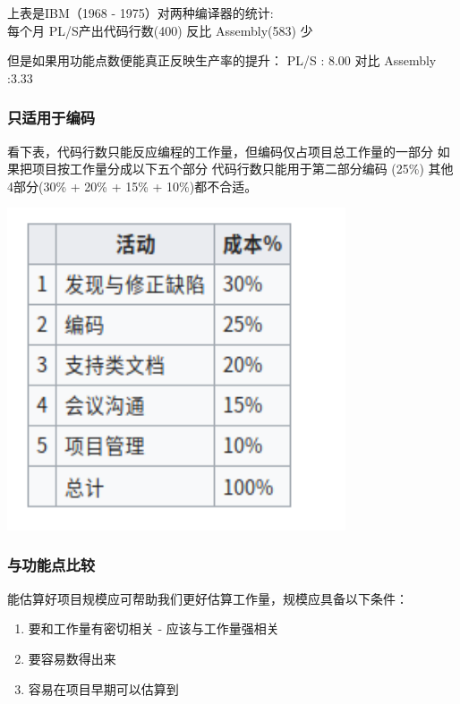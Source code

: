 上表是IBM（1968 - 1975）对两种编译器的统计:\\
每个月 PL/S产出代码行数(400) 反比 Assembly(583) 少

但是如果用功能点数便能真正反映生产率的提升： PL/S : 8.00 对比 Assembly
:3.33

\hypertarget{ux53eaux9002ux7528ux4e8eux7f16ux7801}{%
\subsubsection{只适用于编码}\label{ux53eaux9002ux7528ux4e8eux7f16ux7801}}

看下表，代码行数只能反应编程的工作量，但编码仅占项目总工作量的一部分
如果把项目按工作量分成以下五个部分 代码行数只能用于第二部分编码 (25\%)
其他4部分(30\% + 20\% + 15\% + 10\%)都不合适。


\includegraphics[width=10cm]{Screenshotfrom20221220202832.png}

\hypertarget{ux4e0eux529fux80fdux70b9ux6bd4ux8f83}{%
\subsubsection{与功能点比较}\label{ux4e0eux529fux80fdux70b9ux6bd4ux8f83}}

能估算好项目规模应可帮助我们更好估算工作量，规模应具备以下条件：

\begin{enumerate}
\tightlist
\item
  要和工作量有密切相关 - 应该与工作量强相关
\item
  要容易数得出来
\item
  容易在项目早期可以估算到
\end{enumerate}

